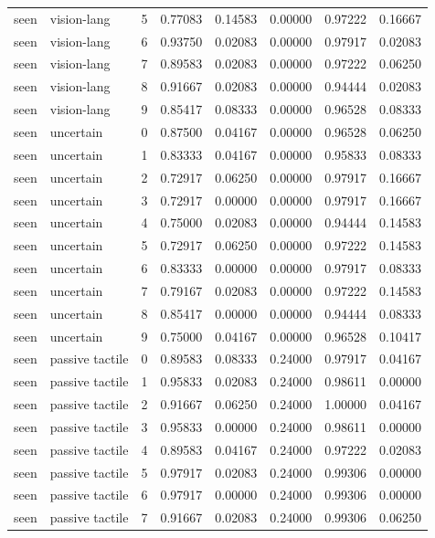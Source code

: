 \documentclass{article}
\begin{document}
\begin{center}
\begin{longtable}{llllllll}
seen & vision-lang & 5 & 0.77083 & 0.14583 & 0.00000 & 0.97222 & 0.16667 \\
seen & vision-lang & 6 & 0.93750 & 0.02083 & 0.00000 & 0.97917 & 0.02083 \\
seen & vision-lang & 7 & 0.89583 & 0.02083 & 0.00000 & 0.97222 & 0.06250 \\
seen & vision-lang & 8 & 0.91667 & 0.02083 & 0.00000 & 0.94444 & 0.02083 \\
seen & vision-lang & 9 & 0.85417 & 0.08333 & 0.00000 & 0.96528 & 0.08333 \\
seen & uncertain & 0 & 0.87500 & 0.04167 & 0.00000 & 0.96528 & 0.06250 \\
seen & uncertain & 1 & 0.83333 & 0.04167 & 0.00000 & 0.95833 & 0.08333 \\
seen & uncertain & 2 & 0.72917 & 0.06250 & 0.00000 & 0.97917 & 0.16667 \\
seen & uncertain & 3 & 0.72917 & 0.00000 & 0.00000 & 0.97917 & 0.16667 \\
seen & uncertain & 4 & 0.75000 & 0.02083 & 0.00000 & 0.94444 & 0.14583 \\
seen & uncertain & 5 & 0.72917 & 0.06250 & 0.00000 & 0.97222 & 0.14583 \\
seen & uncertain & 6 & 0.83333 & 0.00000 & 0.00000 & 0.97917 & 0.08333 \\
seen & uncertain & 7 & 0.79167 & 0.02083 & 0.00000 & 0.97222 & 0.14583 \\
seen & uncertain & 8 & 0.85417 & 0.00000 & 0.00000 & 0.94444 & 0.08333 \\
seen & uncertain & 9 & 0.75000 & 0.04167 & 0.00000 & 0.96528 & 0.10417 \\
seen & passive tactile & 0 & 0.89583 & 0.08333 & 0.24000 & 0.97917 & 0.04167 \\
seen & passive tactile & 1 & 0.95833 & 0.02083 & 0.24000 & 0.98611 & 0.00000 \\
seen & passive tactile & 2 & 0.91667 & 0.06250 & 0.24000 & 1.00000 & 0.04167 \\
seen & passive tactile & 3 & 0.95833 & 0.00000 & 0.24000 & 0.98611 & 0.00000 \\
seen & passive tactile & 4 & 0.89583 & 0.04167 & 0.24000 & 0.97222 & 0.02083 \\
seen & passive tactile & 5 & 0.97917 & 0.02083 & 0.24000 & 0.99306 & 0.00000 \\
seen & passive tactile & 6 & 0.97917 & 0.00000 & 0.24000 & 0.99306 & 0.00000 \\
seen & passive tactile & 7 & 0.91667 & 0.02083 & 0.24000 & 0.99306 & 0.06250 \\

\end{longtable}
\end{center}
\end{document}
